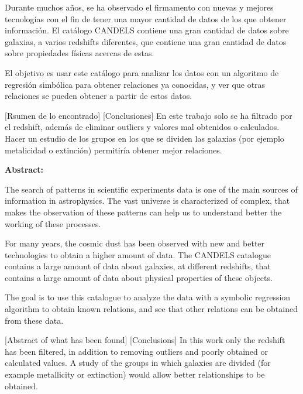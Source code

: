 \documentclass[11pt, a4paper]{article} %
\begin{document}
Durante muchos años, se ha observado el firmamento con nuevas y mejores tecnologías con el 
fin de tener una mayor cantidad de datos de los que obtener información. El catálogo CANDELS
contiene una gran cantidad de datos sobre galaxias,  a varios redshifts diferentes, que 
contiene una gran cantidad de datos sobre propiedades físicas acercas de estas. 

El objetivo es usar este catálogo para analizar los datos con un algoritmo de regresión simbólica 
para obtener relaciones ya conocidas, y ver que otras relaciones se pueden obtener a partir de 
estos datos.

[Rsumen de lo encontrado]
[Conclusiones]
En este trabajo solo se ha filtrado por el redshift, además de eliminar outliers y valores mal obtenidos o calculados. Hacer un estudio de los grupos en los que se dividen las galaxias (por ejemplo metalicidad o extinción) permitiría obtener mejor relaciones.
\vspace{10mm}

{\bfseries \large Abstract: } \vspace{5mm} 

The search of patterns in scientific experiments data is one of the main sources of 
information in astrophysics. The vast universe is characterized of complex, that makes the
observation of these patterns can help us to understand better the working of these processes.

For many years, the cosmic dust has been observed with new and better technologies to obtain a 
higher amount of data. The CANDELS catalogue contains a large amount of data about galaxies, 
at different redshifts, that contains a large amount of data about physical properties of these objects.

The goal is to use this catalogue to analyze the data with a symbolic regression algorithm to obtain 
known relations, and see that other relations can be obtained from these data.

[Abstract of what has been found]
[Conclusions]
In this work only the redshift has been filtered, in addition to removing outliers and poorly obtained or calculated values. A study of the groups in which galaxies are divided (for example metallicity or extinction) would allow better relationships to be obtained.

\vspace{1cm}

\end{document}

